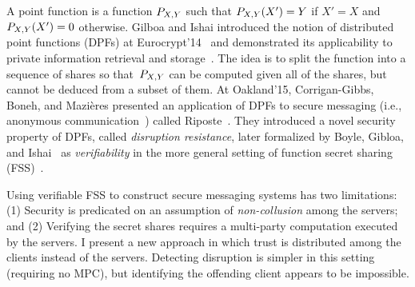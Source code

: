 %
%
\label{sec:intro}
\newcommand{\pta}{\pt[P,X,Y]} A point function is a function $\pta$ such that
$\pta(X') = Y$ if $X' = X$ and $\pta(X') = 0$ otherwise.
%
Gilboa and Ishai introduced the notion of distributed point functions (DPFs) at
Eurocrypt'14~\cite{gilboa2014distributed} and demonstrated its applicability to
private information retrieval and
storage~\cite{chor1998private,ostrovsky1997private}.
%
The idea is to split the function into a sequence of shares so that~$\pta$ can
be computed given all of the shares, but cannot be deduced from a subset of
them.
%
At Oakland'15, Corrigan-Gibbs, Boneh, and Mazi\`{e}res presented an application
of DPFs to secure messaging (i.e., anonymous
communication~\cite{chaum1981untraceable,dingledine2004tor}) called
Riposte~\cite{corrigangibbs2015riposte}.
%
They introduced a novel security property of DPFs, called \emph{disruption
resistance}, later formalized by Boyle, Gibloa, and
Ishai~\cite{boyle2016function} as \emph{verifiability} in the more general
setting of function secret sharing (FSS)~\cite{boyle2015function}.

Using verifiable FSS to construct secure messaging systems has two limitations:
%
(1) Security is predicated on an assumption of \emph{non-collusion} among the
servers; and (2) Verifying the secret shares requires a multi-party computation
executed by the servers.
%
I present a new approach in which trust is distributed among the clients instead
of the servers. Detecting disruption is simpler in this setting (requiring no
MPC), but identifying the offending client appears to be impossible.

\noindent
{}
